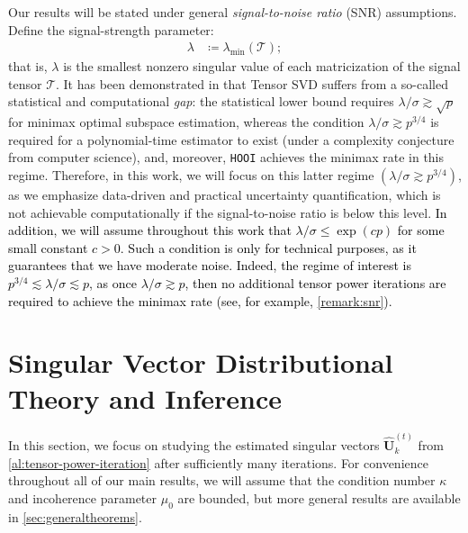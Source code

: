 \documentclass[10pt]{article}
\newcommand{\0}{{\mathbf{0}}}
\newcommand{\1}{{\mathbf{1}}}
\renewcommand{\citet}{\cite}
\newcommand{\uhat}{\mathbf{\hat{U}}}
\renewcommand{\hat}{\widehat}
\renewcommand{\hat}{\widehat}
\begin{document}
Our results will be stated under general \emph{signal-to-noise ratio} (SNR) assumptions.   Define the signal-strength parameter:
\begin{align*}
    \lambda &\coloneqq \lambda_{\min}(\mathcal{T});
\end{align*}
that is, $\lambda$ is the smallest nonzero singular value of each matricization of the signal tensor $\mathcal{T}$.  It has been demonstrated in \citet{zhang_tensor_2018} that Tensor SVD suffers from a so-called statistical and computational \emph{gap}: the statistical lower bound requires $\lambda/\sigma \gtrsim \sqrt{p}$ for minimax optimal subspace estimation, whereas the condition $\lambda/\sigma \gtrsim p^{3/4}$ is required for a polynomial-time estimator to exist (under a complexity conjecture from computer science), and, moreover, \texttt{HOOI} achieves the minimax rate in this regime.  Therefore, in this work, we will focus on this latter regime $(\lambda/\sigma \gtrsim p^{3/4})$, as we emphasize data-driven and practical uncertainty quantification, which is not achievable computationally if the signal-to-noise ratio is below this level.  \textcolor{black}{In addition, we will assume throughout this work that $\lambda/\sigma \leq \exp(cp)$ for some small constant $c>0$.  Such a condition is only for technical purposes, as it guarantees that we have moderate noise.  Indeed, the regime of interest is $p^{3/4} \lesssim \lambda/\sigma \lesssim p$, as once $\lambda/\sigma \gtrsim p$, then no additional tensor power iterations are required to achieve the minimax rate (see, for example, \cref{remark:snr}).}



\section{Singular Vector Distributional Theory and Inference}
\label{sec:loadings}
 In this section, we focus on studying the estimated singular vectors $\uhat_k^{(t)}$ from \cref{al:tensor-power-iteration} after sufficiently many iterations.   For convenience throughout all of our main results, we will assume that the condition number $\kappa$ and incoherence parameter $\mu_0$ are bounded, but more general results are available in \cref{sec:generaltheorems}.  

\end{document}

